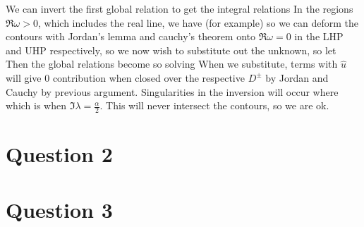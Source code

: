 \documentclass{article}
\begin{document}
We can invert the first global relation to get the integral relations 
In the regions $\Re \omega > 0$, which includes the real line, we have (for example) 
so we can deform the contours with Jordan's lemma and cauchy's theorem onto $\Re\omega = 0$ in the LHP and UHP respectively, so 
we now wish to substitute out the unknown, so let 
Then the global relations become
so solving 
When we substitute, terms with $\hat{u}$ will give 0 contribution when closed over the respective $D^\pm$ by Jordan and Cauchy by previous argument. Singularities in the inversion will occur where 
which is when $\Im\lambda = \frac{\alpha}{2}$. This will never intersect the contours, so we are ok. 
\section{Question 2}

\section{Question 3}
\end{document}
